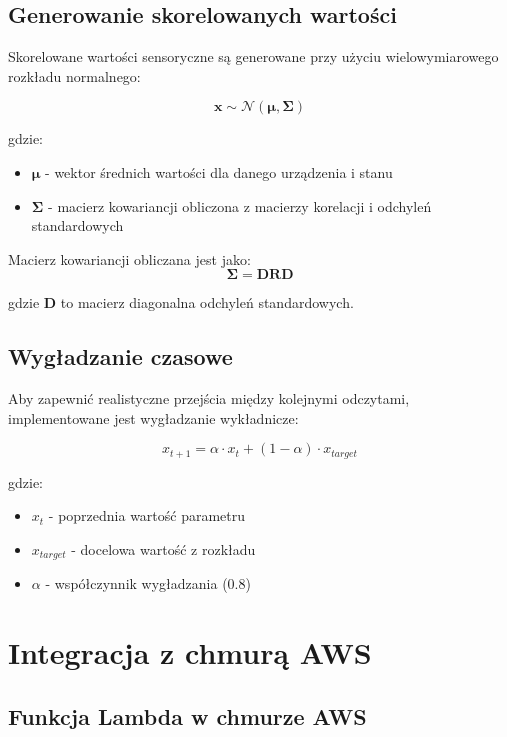 \subsection{Generowanie skorelowanych wartości}
\label{subsec:generowanie_skorelowanych}

Skorelowane wartości sensoryczne są generowane przy użyciu wielowymiarowego rozkładu normalnego:

$$\mathbf{x} \sim \mathcal{N}(\boldsymbol{\mu}, \boldsymbol{\Sigma})$$

gdzie:
\begin{itemize}
    \item $\boldsymbol{\mu}$ - wektor średnich wartości dla danego urządzenia i stanu
    \item $\boldsymbol{\Sigma}$ - macierz kowariancji obliczona z macierzy korelacji i odchyleń standardowych
\end{itemize}

Macierz kowariancji obliczana jest jako:
$$\boldsymbol{\Sigma} = \mathbf{D} \mathbf{R} \mathbf{D}$$

gdzie $\mathbf{D}$ to macierz diagonalna odchyleń standardowych.

\subsection{Wygładzanie czasowe}
\label{subsec:wygladzanie_czasowe}

Aby zapewnić realistyczne przejścia między kolejnymi odczytami, implementowane jest wygładzanie wykładnicze:

$$x_{t+1} = \alpha \cdot x_t + (1-\alpha) \cdot x_{target}$$

gdzie:
\begin{itemize}
    \item $x_t$ - poprzednia wartość parametru
    \item $x_{target}$ - docelowa wartość z rozkładu
    \item $\alpha$ - współczynnik wygładzania (0.8)
\end{itemize}

\section{Integracja z chmurą AWS}
\label{sec:integracja_aws}

\subsection{Funkcja Lambda w chmurze AWS}
\label{subsec:lambda_funkcja}

